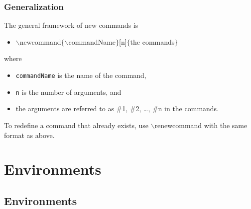 \begin{frame}  \frametitle{Generalization}
	The general framework of new commands is
	\vspace{0.5mm} \\
	\begin{itemize}
		\item[] {\color{command}$\backslash$newcommand\color{braces}$\{${\color{command}$\backslash$commandName}$\}${\color{black}[n]}$\{${\color{highlight}the commands}$\}$}
	\end{itemize}
	\vspace{0.5mm}
	where
	\vspace{0.5mm} \\
	\begin{itemize}
		\item \texttt{commandName} is the name of the command,
		\item \texttt{n} is the number of arguments, and
		\item the arguments are referred to as \#1, \#2, \dots, \#n in {\color{highlight}the commands}.
	\end{itemize}
	\vspace{0.5mm}
	To redefine a command that already exists, use {\color{command}$\backslash$renewcommand} with the same format as above.
\end{frame}

\section[Environments]{Environments}
\subsection[Environments]{Environments}

